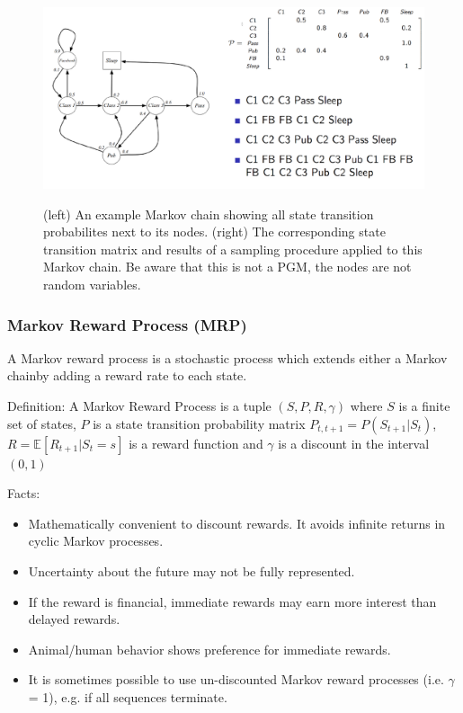 \documentclass[main]{subfiles}
\begin{document}
\begin{figure}[H]
	\centering
	\includegraphics[width=0.9\linewidth]{08_ReinforcementLearning/figures/mc-student-ex.png}
	\label{fig:mc-student-ex}
	\caption{(left) An example Markov chain showing all state transition probabilites next to its nodes. (right) The corresponding state transition matrix and results of a sampling procedure applied to this Markov chain. Be aware that this is not a PGM, the nodes are not random variables.}
\end{figure}


\subsubsection{Markov Reward Process (MRP)}
A Markov reward process is a stochastic process which extends either a Markov chainby adding a reward rate to each state.

Definition: A Markov Reward Process is a tuple $(S, P, R, \gamma) $ where 
$S$ is a finite set of states, 
$P$ is a state transition probability matrix $P_{t,t+1} = P(S_{t+1}|S_t)$,
$R = \mathbb{E}[R_{t+1}|S_t=s]$ is a reward function and
$\gamma$ is a discount in the interval $(0,1)$

Facts:
\begin{itemize}
    \item Mathematically convenient to discount rewards. It avoids infinite returns in cyclic Markov processes.
    \item Uncertainty about the future may not be fully represented.
    \item If the reward is financial, immediate rewards may earn more interest than delayed rewards.
    \item Animal/human behavior shows preference for immediate rewards.
    \item It is sometimes possible to use un-discounted Markov reward processes (i.e. $\gamma$ = 1), e.g. if all sequences terminate.
\end{itemize}
\end{document}
